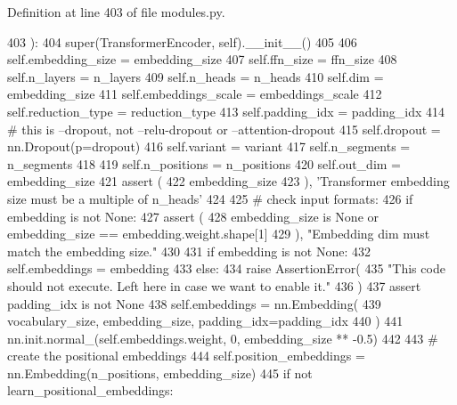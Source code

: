 Definition at line 403 of file modules.\+py.


\begin{DoxyCode}
403     ):
404         super(TransformerEncoder, self).\_\_init\_\_()
405 
406         self.embedding\_size = embedding\_size
407         self.ffn\_size = ffn\_size
408         self.n\_layers = n\_layers
409         self.n\_heads = n\_heads
410         self.dim = embedding\_size
411         self.embeddings\_scale = embeddings\_scale
412         self.reduction\_type = reduction\_type
413         self.padding\_idx = padding\_idx
414         \textcolor{comment}{# this is --dropout, not --relu-dropout or --attention-dropout}
415         self.dropout = nn.Dropout(p=dropout)
416         self.variant = variant
417         self.n\_segments = n\_segments
418 
419         self.n\_positions = n\_positions
420         self.out\_dim = embedding\_size
421         \textcolor{keyword}{assert} (
422             embedding\_size %
423         ), \textcolor{stringliteral}{'Transformer embedding size must be a multiple of n\_heads'}
424 
425         \textcolor{comment}{# check input formats:}
426         \textcolor{keywordflow}{if} embedding \textcolor{keywordflow}{is} \textcolor{keywordflow}{not} \textcolor{keywordtype}{None}:
427             \textcolor{keyword}{assert} (
428                 embedding\_size \textcolor{keywordflow}{is} \textcolor{keywordtype}{None} \textcolor{keywordflow}{or} embedding\_size == embedding.weight.shape[1]
429             ), \textcolor{stringliteral}{"Embedding dim must match the embedding size."}
430 
431         \textcolor{keywordflow}{if} embedding \textcolor{keywordflow}{is} \textcolor{keywordflow}{not} \textcolor{keywordtype}{None}:
432             self.embeddings = embedding
433         \textcolor{keywordflow}{else}:
434             \textcolor{keywordflow}{raise} AssertionError(
435                 \textcolor{stringliteral}{"This code should not execute. Left here in case we want to enable it."}
436             )
437             \textcolor{keyword}{assert} padding\_idx \textcolor{keywordflow}{is} \textcolor{keywordflow}{not} \textcolor{keywordtype}{None}
438             self.embeddings = nn.Embedding(
439                 vocabulary\_size, embedding\_size, padding\_idx=padding\_idx
440             )
441             nn.init.normal\_(self.embeddings.weight, 0, embedding\_size ** -0.5)
442 
443         \textcolor{comment}{# create the positional embeddings}
444         self.position\_embeddings = nn.Embedding(n\_positions, embedding\_size)
445         \textcolor{keywordflow}{if} \textcolor{keywordflow}{not} learn\_positional\_embeddings:

\end{DoxyCode}
